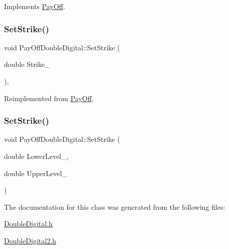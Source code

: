 Implements \hyperlink{classPayOff_a5ae17d82c233ef5568c8fb0539703000}{Pay\+Off}.

\hypertarget{classPayOffDoubleDigital_a2c0474c7433e29ca53a156086d1ac47b}{}\label{classPayOffDoubleDigital_a2c0474c7433e29ca53a156086d1ac47b} 
\subsubsection{\texorpdfstring{Set\+Strike()}{SetStrike()}\hspace{0.1cm}{\footnotesize\ttfamily [1/2]}}
{\footnotesize\ttfamily void Pay\+Off\+Double\+Digital\+::\+Set\+Strike (\begin{DoxyParamCaption}\item[{double}]{Strike\+\_\+ }\end{DoxyParamCaption})\hspace{0.3cm}{\ttfamily [inline]}, {\ttfamily [virtual]}}



Reimplemented from \hyperlink{classPayOff_a3fdefed95df90a057acfd697f5703e04}{Pay\+Off}.

\hypertarget{classPayOffDoubleDigital_a7c5ba80dfded5f9a88865cc437d92227}{}\label{classPayOffDoubleDigital_a7c5ba80dfded5f9a88865cc437d92227} 
\subsubsection{\texorpdfstring{Set\+Strike()}{SetStrike()}\hspace{0.1cm}{\footnotesize\ttfamily [2/2]}}
{\footnotesize\ttfamily void Pay\+Off\+Double\+Digital\+::\+Set\+Strike (\begin{DoxyParamCaption}\item[{double}]{Lower\+Level\+\_\+,  }\item[{double}]{Upper\+Level\+\_\+ }\end{DoxyParamCaption})}



The documentation for this class was generated from the following files\+:\begin{DoxyCompactItemize}
\item 
\hyperlink{DoubleDigital_8h}{Double\+Digital.\+h}\item 
\hyperlink{DoubleDigital2_8h}{Double\+Digital2.\+h}\end{DoxyCompactItemize}
